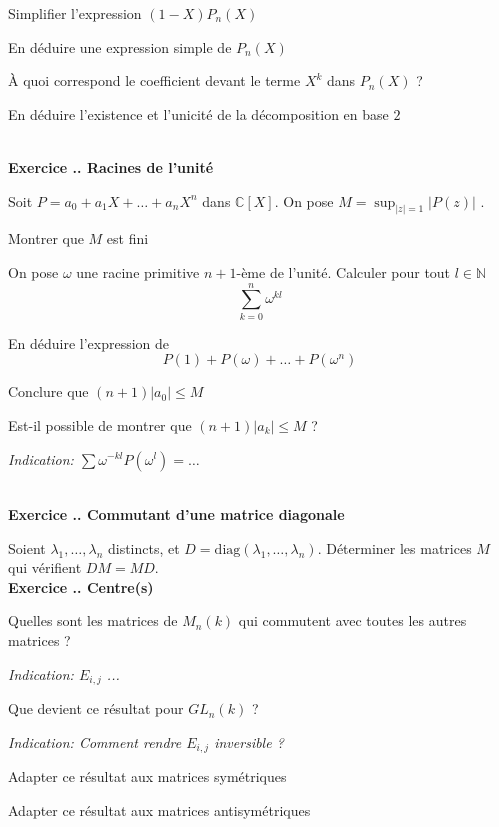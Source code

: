 \documentclass{article}
\newcommand{\mb}[1]{\mathbb{#1}}
\newcounter{exo}
\newcommand{\exercice}[1][\null]{\textbf{\\ Exercice \thesection.\theexo. #1} \addtocounter{exo}{1}}
\newcommand{\indication}[1]{\begin{flushright}\textit{Indication: #1}\end{flushright}}
\begin{document}
\begin{compactenum}[(i)]
\item Simplifier l'expression $(1 - X) P_n (X)$
\item En déduire une expression simple de $P_n(X)$
\item À quoi correspond le coefficient devant le terme $X^k$
    dans $P_n(X)$ ?
\item En déduire l'existence et l'unicité de la décomposition 
    en base $2$
\end{compactenum}

\exercice[Racines de l'unité]
Soit $P = a_0 + a_1 X + \dots + a_n X^n$ dans $\mb{C}[X]$.
On pose $M = \sup_{|z| = 1} |P(z)|$ .
\begin{compactenum}[(i)]
\item Montrer que $M$ est fini 
\item On pose $\omega$ une racine primitive $n+1$-ème de l'unité.
    Calculer pour tout $l \in \mathbb{N}$
    \begin{equation*}
        \sum_{k = 0}^n \omega^{kl} 
    \end{equation*}
\item En déduire l'expression de 
    \begin{equation*}
        P(1) + P(\omega) + \dots + P(\omega^n)
    \end{equation*}
\item Conclure que $(n+1) |a_0| \leq M$
\item Est-il possible de montrer que $(n+1) |a_k| \leq M$ ?
    \indication{$\sum \omega^{-kl} P(\omega^l) = \dots$}
\end{compactenum}

\exercice[Commutant d'une matrice diagonale]
Soient $\lambda_1, \dots, \lambda_n$ distincts, 
et $D = \textrm{diag}(\lambda_1, \dots, \lambda_n)$. Déterminer 
les matrices $M$ qui vérifient $DM = MD$.
\exercice[Centre(s)]

\begin{compactenum}[(i)]
\item Quelles sont les matrices de $M_n(k)$ qui commutent 
avec toutes les autres matrices ?
\indication{$E_{i,j}$ ... }

\item Que devient ce résultat pour $GL_n(k)$ ?
\indication{Comment rendre $E_{i,j}$ inversible ?}
\item Adapter ce résultat aux matrices symétriques 
\item Adapter ce résultat aux matrices antisymétriques
\end{compactenum}
\end{document}
